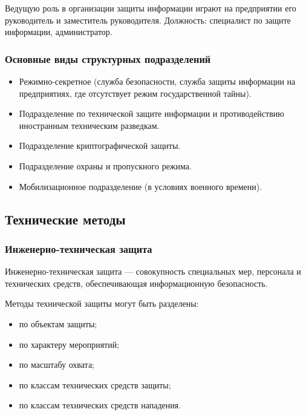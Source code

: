 Ведущую роль в организации защиты информации играют на предприятии его руководитель и заместитель руководителя. Должность: специалист по защите информации, администратор.

\begin{frame}
\frametitle{Основные виды структурных подразделений}
\begin{itemize}
    \item Режимно-секретное (служба безопасности, служба защиты информации на предприятиях, где отсутствует режим государственной тайны).
    \item Подразделение по технической защите информации и противодействию иностранным техническим разведкам.
    \item Подразделение криптографической защиты.
    \item Подразделение охраны и пропускного режима.
    \item Мобилизационное подразделение (в условиях военного времени).
\end{itemize}
\end{frame}


\subsection{Технические методы}


\begin{frame}
\frametitle{Инженерно-техническая защита}
\begin{definition}%
    \alert{Инженерно-техническая защита} --- совокупность специальных мер, персонала и технических средств, обеспечивающая информационную безопасность.
\end{definition}
Методы технической защиты могут быть разделены:
\begin{itemize}
    \item по объектам защиты; %
    \item по характеру мероприятий; %
    \item по масштабу охвата; %
    \item по классам технических средств защиты; %
    \item по классам технических средств нападения.
\end{itemize}
\end{frame}


